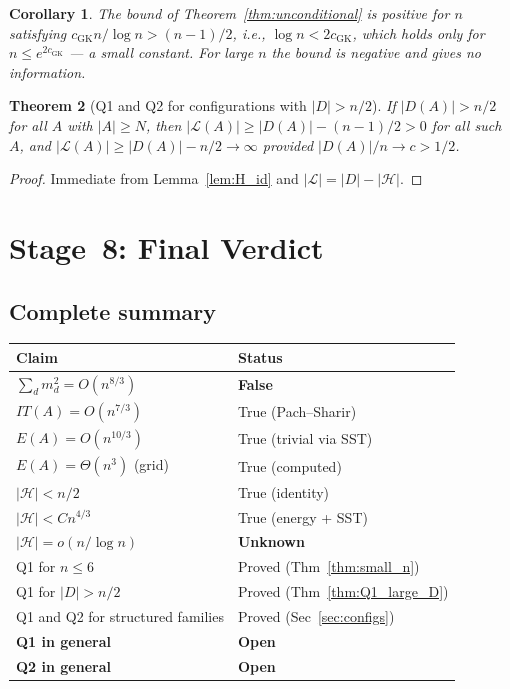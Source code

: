 \documentclass[12pt,a4paper]{amsart}
\theoremstyle{plain}
\newtheorem{theorem}{Theorem}[section]
\newtheorem{corollary}[theorem]{Corollary}
\theoremstyle{definition}
\newcommand{\abs}[1]{\left\lvert #1 \right\rvert}
\newcommand{\cL}{\mathcal{L}}
\newcommand{\cH}{\mathcal{H}}
\begin{document}
\begin{corollary}
The bound of Theorem~\ref{thm:unconditional} is positive for $n$
satisfying $c_{\mathrm{GK}} n/\log n > (n-1)/2$, i.e., $\log n < 2c_{\mathrm{GK}}$,
which holds only for $n \le e^{2c_{\mathrm{GK}}}$ --- a small constant.
For large $n$ the bound is negative and gives no information.
\end{corollary}

\begin{theorem}[Q1 and Q2 for configurations with $\abs{D} > n/2$]
\label{thm:Q2_large_D}
If $\abs{D(A)} > n/2$ for all $A$ with $\abs{A} \ge N$, then
$\abs{\cL(A)} \ge \abs{D(A)} - (n-1)/2 > 0$ for all such $A$,
and $\abs{\cL(A)} \ge \abs{D(A)} - n/2 \to \infty$ provided
$\abs{D(A)}/n \to c > 1/2$.
\end{theorem}

\begin{proof}
Immediate from Lemma~\ref{lem:H_id} and $\abs{\cL} = \abs{D} - \abs{\cH}$.
\end{proof}

\section{Stage~8: Final Verdict}
\label{sec:verdict}

\subsection{Complete summary}

\begin{center}
\begin{tabular}{p{8cm}p{4cm}}
\toprule
\textbf{Claim} & \textbf{Status} \\
\midrule
$\sum_d m_d^2 = O(n^{8/3})$ & \textbf{False} \\
$IT(A) = O(n^{7/3})$ & True (Pach--Sharir) \\
$E(A) = O(n^{10/3})$ & True (trivial via SST) \\
$E(A) = \Theta(n^3)$ (grid) & True (computed) \\
$\abs{\cH} < n/2$ & True (identity) \\
$\abs{\cH} < Cn^{4/3}$ & True (energy + SST) \\
$\abs{\cH} = o(n/\log n)$ & \textbf{Unknown} \\
Q1 for $n \le 6$ & Proved (Thm~\ref{thm:small_n}) \\
Q1 for $\abs{D} > n/2$ & Proved (Thm~\ref{thm:Q1_large_D}) \\
Q1 and Q2 for structured families & Proved (Sec~\ref{sec:configs}) \\
\textbf{Q1 in general} & \textbf{Open} \\
\textbf{Q2 in general} & \textbf{Open} \\
\bottomrule
\end{tabular}
\end{center}
\end{document}
